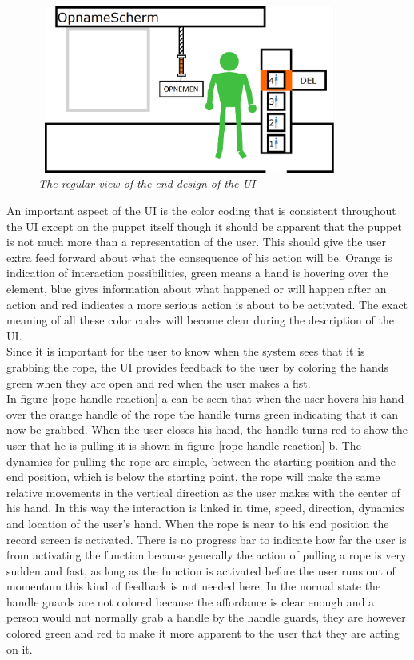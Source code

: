 \begin{figure}[H]
	\begin{center}
		\includegraphics[width=10cm, height=5.5cm]{figures/1_screen_with_user.png}
		\caption{\emph{The regular view of the end design of the UI}}
		\label{regular view end design}
	\end{center}
\end{figure}

An important aspect of the UI is the color coding that is consistent throughout the UI except on the puppet itself though it should be apparent that the puppet is not much more than a representation of the user. This should give the user extra feed forward about what the consequence of his action will be. Orange is indication of interaction possibilities, green means a hand is hovering over the element, blue gives information about what happened or will happen after an action and red indicates a more serious action is about to be activated. The exact meaning of all these color codes will become clear during the description of the UI.\\

Since it is important for the user to know when the system sees that it is grabbing the rope, the UI provides feedback to the user by coloring the hands green when they are open and red when the user makes a fist.\\

In figure \ref{rope handle reaction} a can be seen that when the user hovers his hand over the orange handle of the rope the handle turns green indicating that it can now be grabbed. When the user closes his hand, the handle turns red to show the user that he is pulling it is shown in figure \ref{rope handle reaction} b. The dynamics for pulling the rope are simple, between the starting position and the end position, which is below the starting point, the rope will make the same relative movements in the vertical direction as the user makes with the center of his hand. In this way the interaction is linked in time, speed, direction, dynamics and location of the user's hand. When the rope is near to his end position the record screen is activated. There is no progress bar to indicate how far the user is from activating the function because generally the action of pulling a rope is very sudden and fast, as long as the function is activated before the user runs out of momentum this kind of feedback is not needed here. In the normal state the handle guards are not colored because the affordance is clear enough and a person would not normally grab a handle by the handle guards, they are however colored green and red to make it more apparent to the user that they are acting on it.\\

